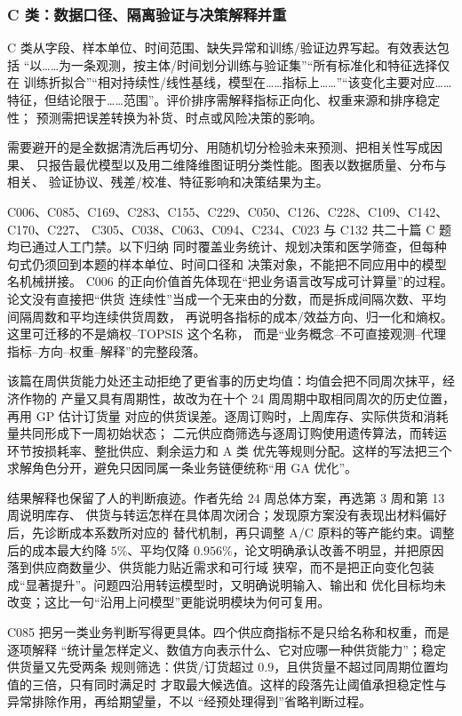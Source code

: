 \subsubsection{C 类：数据口径、隔离验证与决策解释并重}

C 类从字段、样本单位、时间范围、缺失异常和训练/验证边界写起。有效表达包括
“以……为一条观测，按主体/时间划分训练与验证集”“所有标准化和特征选择仅在
训练折拟合”“相对持续性/线性基线，模型在……指标上……”“该变化主要对应……
特征，但结论限于……范围”。评价排序需解释指标正向化、权重来源和排序稳定性；
预测需把误差转换为补货、时点或风险决策的影响。

需要避开的是全数据清洗后再切分、用随机切分检验未来预测、把相关性写成因果、
只报告最优模型以及用二维降维图证明分类性能。图表以数据质量、分布与相关、
验证协议、残差/校准、特征影响和决策结果为主。

C006、C085、C169、C283、C155、C229、C050、C126、C228、C109、C142、C170、C227、
C305、C038、C063、C094、C234、C023 与 C132 共二十篇 C 题均已通过人工门禁。以下归纳
同时覆盖业务统计、规划决策和医学筛查，但每种句式仍须回到本题的样本单位、时间口径和
决策对象，不能把不同应用中的模型名机械拼接。
C006 的正向价值首先体现在“把业务语言改写成可计算量”的过程。论文没有直接把“供货
连续性”当成一个无来由的分数，而是拆成间隔次数、平均间隔周数和平均连续供货周数，
再说明各指标的成本/效益方向、归一化和熵权。这里可迁移的不是熵权--TOPSIS 这个名称，
而是“业务概念--不可直接观测--代理指标--方向--权重--解释”的完整段落。

该篇在周供货能力处还主动拒绝了更省事的历史均值：均值会把不同周次抹平，经济作物的
产量又具有周期性，故改为在十个 24 周周期中取相同周次的历史位置，再用 GP 估计订货量
对应的供货误差。逐周订购时，上周库存、实际供货和消耗量共同形成下一周初始状态；
二元供应商筛选与逐周订购使用遗传算法，而转运环节按损耗率、整批供应、剩余运力和 A 类
优先等规则分配。这样的写法把三个求解角色分开，避免只因同属一条业务链便统称“用 GA
优化”。

结果解释也保留了人的判断痕迹。作者先给 24 周总体方案，再选第 3 周和第 13 周说明库存、
供货与转运怎样在具体周次闭合；发现原方案没有表现出材料偏好后，先诊断成本系数所对应的
替代机制，再只调整 A/C 原料的等产能约束。调整后的成本最大约降 $5\%$、平均仅降
$0.956\%$，论文明确承认改善不明显，并把原因落到供应商数量少、供货能力贴近需求和可行域
狭窄，而不是把正向变化包装成“显著提升”。问题四沿用转运模型时，又明确说明输入、输出和
优化目标均未改变；这比一句“沿用上问模型”更能说明模块为何可复用。

C085 把另一类业务判断写得更具体。四个供应商指标不是只给名称和权重，而是逐项解释
“统计量怎样定义、数值方向表示什么、它对应哪一种供货能力”；稳定供货量又先受两条
规则筛选：供货/订货超过 $0.9$，且供货量不超过同周期位置均值的三倍，只有同时满足时
才取最大候选值。这样的段落先让阈值承担稳定性与异常排除作用，再给期望量，不以
“经预处理得到”省略判断过程。

